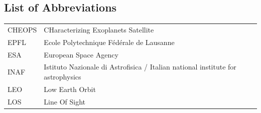 \documentclass[a4paper,10pt]{article}
\begin{document}


\begin{appendices}
\section{List of Abbreviations} \label{app:abbreviations}
 \begin{table}[!h]
 \begin{center}
  \begin{tabular}{lp{13.5cm}} \toprule
    CHEOPS & CHaracterizing Exoplanets Satellite \\
    EPFL & Ecole Polytechnique F\'ed\'erale de Lausanne \\
    ESA & European Space Agency \\
    INAF & Istituto Nazionale di Astrofisica / Italian national institute for astrophysics\\
    LEO & Low Earth Orbit \\
    LOS & Line Of Sight \\

\end{tabular}
\end{center}
\end{table}
\end{appendices}
\end{document}
